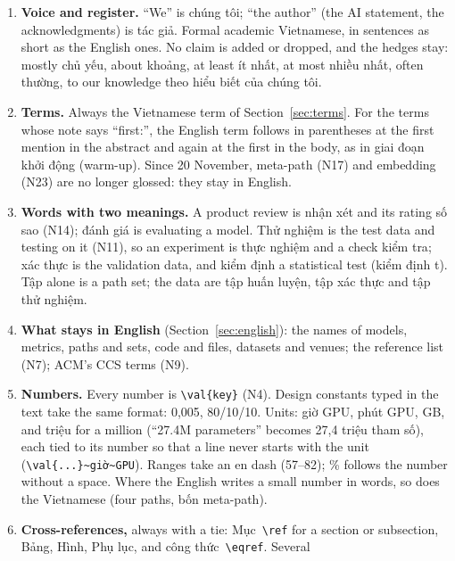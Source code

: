\documentclass[11pt,a4paper]{article}
\newcommand{\vi}[1]{\foreignlanguage{vietnamese}{#1}}
\begin{document}
\begin{enumerate}[label=S\arabic*]
  \item \textbf{Voice and register.} ``We'' is \vi{chúng tôi}; ``the author'' (the AI statement,
        the acknowledgments) is \vi{tác giả}. Formal academic Vietnamese, in sentences as short
        as the English ones. No claim is added or dropped, and the hedges stay: mostly
        \vi{chủ yếu}, about \vi{khoảng}, at least \vi{ít nhất}, at most \vi{nhiều nhất}, often
        \vi{thường}, to our knowledge \vi{theo hiểu biết của chúng tôi}.
  \item \textbf{Terms.} Always the Vietnamese term of Section~\ref{sec:terms}. For the terms
        whose note says ``first:'', the English term follows in parentheses at the first mention
        in the abstract and again at the first in the body, as in \vi{giai đoạn khởi động
        (warm-up)}. Since 20 November, meta-path (N17) and embedding (N23) are no longer glossed:
        they stay in English.
  \item \textbf{Words with two meanings.} A product review is \vi{nhận xét} and its rating
        \vi{số sao} (N14); \vi{đánh giá} is evaluating a model. \vi{Thử nghiệm} is the test data
        and testing on it (N11), so an experiment is \vi{thực nghiệm} and a check \vi{kiểm tra};
        \vi{xác thực} is the validation data, and \vi{kiểm định} a statistical test (\vi{kiểm
        định t}). \vi{Tập} alone is a path set; the data are \vi{tập huấn luyện}, \vi{tập xác
        thực} and \vi{tập thử nghiệm}.
  \item \textbf{What stays in English} (Section~\ref{sec:english}): the names of models,
        metrics, paths and sets, code and files, datasets and venues; the reference list (N7);
        ACM's CCS terms (N9).
  \item \textbf{Numbers.} Every number is \verb|\val{key}| (N4). Design constants typed in the
        text take the same format: \vi{0,005}, \vi{80/10/10}. Units: \vi{giờ GPU}, \vi{phút GPU},
        GB, and \vi{triệu} for a million (``27.4M parameters'' becomes \vi{27,4 triệu tham số}),
        each tied to its number so that a line never starts with the unit
        (\verb|\val{...}~giờ~GPU|).
        Ranges take an en dash (57--82); \% follows the number without a space. Where the English
        writes a small number in words, so does the Vietnamese (four paths, \vi{bốn meta-path}).
  \item \textbf{Cross-references,} always with a tie: \vi{Mục}~\verb|\ref| for a section or
        subsection, \vi{Bảng}, \vi{Hình}, \vi{Phụ lục}, and \vi{công thức}~\verb|\eqref|. Several

\end{enumerate}
\end{document}
